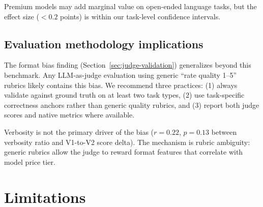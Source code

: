 \documentclass[11pt]{article}
\begin{document}
Premium models may add marginal value on open-ended language tasks, but
the effect size ($< 0.2$ points) is within our task-level confidence
intervals.

\subsection{Evaluation methodology implications}

The format bias finding (Section~\ref{sec:judge-validation}) generalizes
beyond this benchmark.  Any LLM-as-judge evaluation using generic ``rate
quality 1--5'' rubrics likely contains this bias.  We recommend three
practices: (1) always validate against ground truth on at least two task
types, (2) use task-specific correctness anchors rather than generic
quality rubrics, and (3) report both judge scores and native metrics
where available.

Verbosity is not the primary driver of the bias ($r = 0.22$, $p = 0.13$
between verbosity ratio and V1-to-V2 score delta).  The mechanism is
rubric ambiguity: generic rubrics allow the judge to reward format
features that correlate with model price tier.


\section{Limitations}
\label{sec:limitations}
\end{document}

